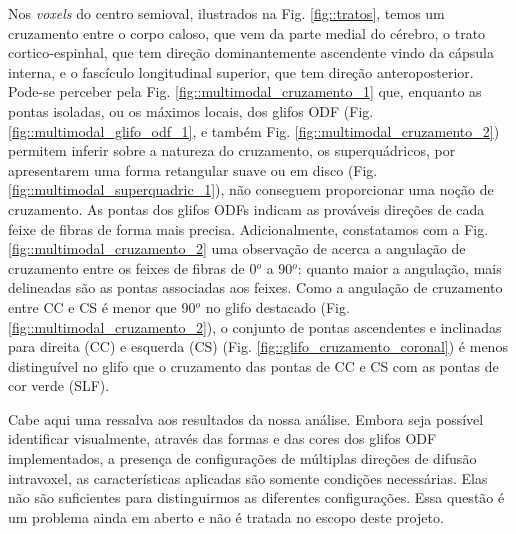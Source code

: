 Nos \textit{voxels} do centro semioval, ilustrados na Fig. \ref{fig::tratos},  temos um cruzamento entre o corpo caloso, que vem da parte medial do cérebro,
o trato cortico-espinhal, que tem direção dominantemente ascendente vindo da cápsula interna, e o fascículo longitudinal superior, que tem direção anteroposterior. Pode-se perceber pela Fig. \ref{fig::multimodal_cruzamento_1} que, 
enquanto as pontas isoladas, ou os máximos locais, dos glifos ODF (Fig. \ref{fig::multimodal_glifo_odf_1}, e também Fig. \ref{fig::multimodal_cruzamento_2}) permitem inferir sobre a natureza do cruzamento, os superquádricos, por apresentarem uma forma retangular suave ou em disco (Fig. \ref{fig::multimodal_superquadric_1}), não conseguem proporcionar uma noção de cruzamento. As pontas dos glifos ODFs indicam as prováveis direções de cada feixe de fibras de forma mais precisa. Adicionalmente, constatamos com a Fig. \ref{fig::multimodal_cruzamento_2} uma observação de  acerca a angulação de cruzamento entre os feixes de fibras de 0$^o$ a 90$^o$: quanto maior a angulação, mais delineadas são as pontas associadas aos feixes. Como a angulação de cruzamento entre CC e CS é menor que 90$^o$ no glifo destacado (Fig. \ref{fig::multimodal_cruzamento_2}), o conjunto de pontas ascendentes e inclinadas para direita (CC) e esquerda (CS) (Fig. \ref{fig::glifo_cruzamento_coronal}) é menos distinguível no glifo que o cruzamento das pontas de CC e CS com as pontas de cor verde (SLF).


Cabe aqui uma ressalva aos resultados da nossa análise. Embora seja possível identificar visualmente, através das formas e das cores dos glifos ODF implementados, a presença de configurações de múltiplas direções de difusão intravoxel, as características aplicadas são somente condições necessárias. Elas não são suficientes para distinguirmos as diferentes configurações. Essa questão é um problema ainda em aberto \cite{SCHILLING2019194} e não é tratada no escopo deste projeto.

